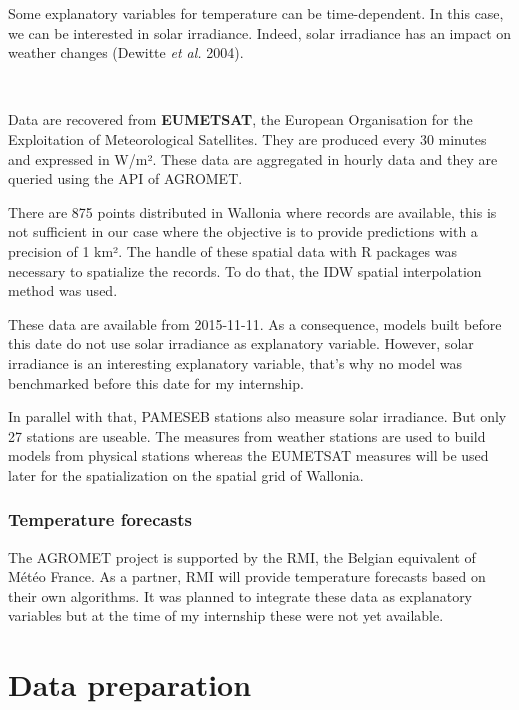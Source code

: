 \documentclass[12pt,twoside]{reedthesis}
\theoremstyle{definition}
\theoremstyle{definition}
\theoremstyle{definition}
\theoremstyle{remark}
\begin{document}
Some explanatory variables for temperature can be time-dependent. In
this case, we can be interested in solar irradiance. Indeed, solar
irradiance has an impact on weather changes (Dewitte \emph{et al.}
2004).

~

Data are recovered from \textbf{EUMETSAT}, the European Organisation for
the Exploitation of Meteorological Satellites. They are produced every
30 minutes and expressed in W/m². These data are aggregated in hourly
data and they are queried using the API of AGROMET.

There are 875 points distributed in Wallonia where records are
available, this is not sufficient in our case where the objective is to
provide predictions with a precision of 1 km². The handle of these
spatial data with R packages was necessary to spatialize the records. To
do that, the IDW spatial interpolation method was used.

These data are available from 2015-11-11. As a consequence, models built
before this date do not use solar irradiance as explanatory variable.
However, solar irradiance is an interesting explanatory variable, that's
why no model was benchmarked before this date for my internship.

In parallel with that, PAMESEB stations also measure solar irradiance.
But only 27 stations are useable. The measures from weather stations are
used to build models from physical stations whereas the EUMETSAT
measures will be used later for the spatialization on the spatial grid
of Wallonia.

\subsubsection{Temperature forecasts}\label{temperature-forecasts}

The AGROMET project is supported by the RMI, the Belgian equivalent of
Météo France. As a partner, RMI will provide temperature forecasts based
on their own algorithms. It was planned to integrate these data as
explanatory variables but at the time of my internship these were not
yet available.

\section{Data preparation}\label{data-preparation}
\end{document}
